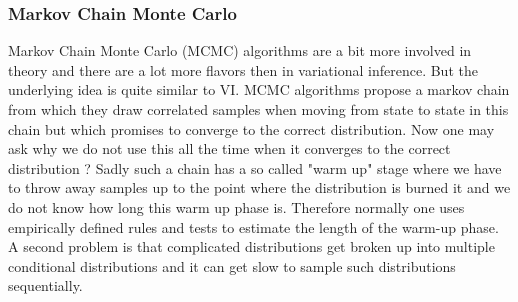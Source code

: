 \documentclass[10pt,conference,compsocconf]{IEEEtran}
\begin{document}
\subsubsection{Markov Chain Monte Carlo}
Markov Chain Monte Carlo (MCMC) algorithms are a bit more involved in theory and there are a lot more flavors then in variational inference. But the underlying idea is quite similar to VI. MCMC algorithms propose a markov chain from which they draw correlated samples when moving from state to state in this chain but which promises to converge to the correct distribution. Now one may ask why we do not use this all the time when it converges to the correct distribution ? Sadly such a chain has a so called "warm up" stage where we have to throw away samples up to the point where the distribution is burned it and we do not know how long this warm up phase is. Therefore normally one uses empirically defined rules and tests to estimate the length of the warm-up phase. A second problem is that complicated distributions get broken up into multiple conditional distributions and it can get slow to sample such distributions sequentially. \\
\end{document}
